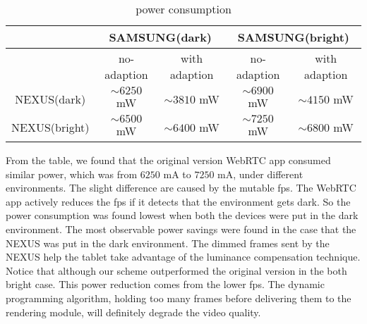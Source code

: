 \begin{table}[h]
  \centering
  \caption{power consumption}
  \label{tab:power_consumption}
  \begin{tabular}{|c|c|c|c|c|} %
    \hline
    & \multicolumn{2}{|c|}{SAMSUNG(dark)} & \multicolumn{2}{|c|}{SAMSUNG(bright)} \\ \hline
    & no-adaption & with adaption & no-adaption & with adaption \\ \hline
    NEXUS(dark) & $\sim{6250}$ mW & $\sim{3810}$ mW & $\sim{6900}$ mW & $\sim{4150}$ mW  \\ \hline
    NEXUS(bright) & $\sim{6500}$ mW & $\sim{6400}$ mW & $\sim{7250}$ mW & $\sim{6800}$ mW \\ \hline
  \end{tabular}
  
\end{table}

From the table, we found that the original version WebRTC app consumed
similar power, which was from $6250$ mA to $7250$ mA, under different
environments. The slight difference are caused by the mutable fps. The
WebRTC app actively reduces the fps if it detects that the environment
gets dark. So the power consumption was found lowest when both the
devices were put in the dark environment. The most observable power
savings were found in the case that the NEXUS was put in the dark
environment. The dimmed frames sent by the NEXUS help the tablet take
advantage of the luminance compensation technique.  Notice that
although our scheme outperformed the original version in the both
bright case. This power reduction comes from the lower fps. The
dynamic programming algorithm, holding too many frames before
delivering them to the rendering module, will definitely degrade the
video quality.


